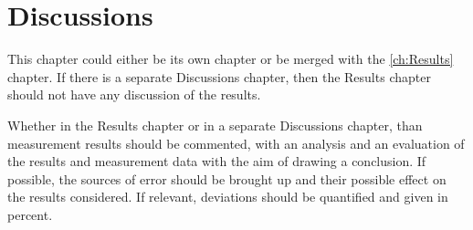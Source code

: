 \chapter{Discussions}
This chapter could either be its own chapter or be merged with the \ref{ch:Results} chapter. If there is a separate Discussions chapter, then the Results chapter should not have any discussion of the results.

Whether in the Results chapter or in a separate Discussions chapter, than measurement results should be commented, with an analysis and an evaluation of the results and measurement data with the aim of drawing a conclusion. If possible, the sources of error should be brought up and their possible effect on the results considered. If relevant, deviations should be quantified and given in percent.

